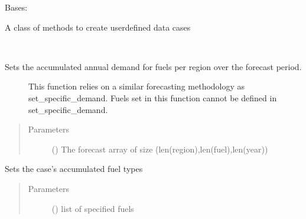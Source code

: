 \documentclass[a4paper,12pt,english]{article}
\begin{document}
\begin{fulllineitems}
\label{\detokenize{GOCPI:GOCPI.CreateCases.CreateCases}}
Bases: 

A class of methods to create user\sphinxhyphen{}defined data cases

\begin{fulllineitems}
\label{\detokenize{GOCPI:GOCPI.CreateCases.CreateCases.set_accumulated_annual_demand}}~\begin{description}
\item[{Sets the accumulated annual demand for fuels per region over the forecast period.}] \leavevmode
This function relies on a similar forecasting methodology as set\_specific\_demand.
Fuels set in this function cannot be defined in set\_specific\_demand.

\end{description}
\begin{quote}\begin{description}
\item[{Parameters}] \leavevmode
{} (\sphinxstyleliteralemphasis{\sphinxupquote{, }}) \textendash{} The forecast array of size (len(region),len(fuel),len(year))

\end{description}\end{quote}

\end{fulllineitems}


\begin{fulllineitems}
\label{\detokenize{GOCPI:GOCPI.CreateCases.CreateCases.set_accumulated_fuel}}
Sets the case’s accumulated fuel types
\begin{quote}\begin{description}
\item[{Parameters}] \leavevmode
{} () \textendash{} list of specified fuels


\end{description}
\end{quote}
\end{fulllineitems}
\end{fulllineitems}
\end{document}
